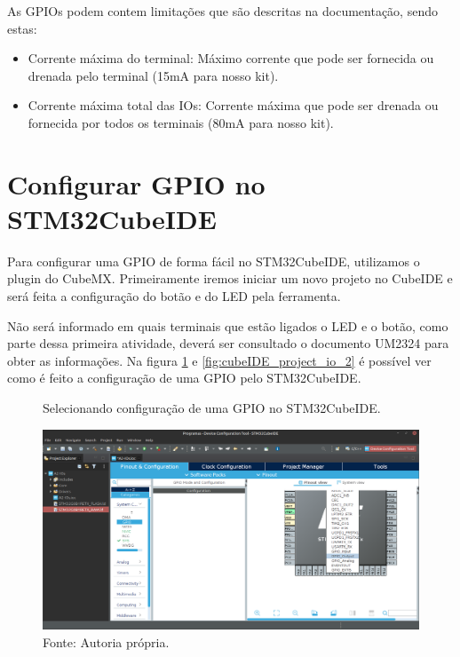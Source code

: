 \documentclass[12pt,a4paper]{report}
\begin{document}
As GPIOs podem contem limitações que são descritas na documentação, sendo estas:

\begin{itemize}
    \item Corrente máxima do terminal: Máximo corrente que pode ser fornecida ou drenada pelo terminal (15mA para nosso kit).
    \item Corrente máxima total das IOs: Corrente máxima que pode ser drenada ou fornecida por todos os terminais (80mA para nosso kit).
\end{itemize}

\section{Configurar GPIO no STM32CubeIDE}

Para configurar uma GPIO de forma fácil no STM32CubeIDE, utilizamos o plugin do CubeMX. Primeiramente iremos iniciar um novo projeto no CubeIDE e será feita a configuração do botão e do LED pela ferramenta.

Não será informado em quais terminais que estão ligados o LED e o botão, como parte dessa primeira atividade, deverá ser consultado o documento UM2324 para obter as informações. Na figura \ref{fig:cubeIDE_project_io_1} e \ref{fig:cubeIDE_project_io_2} é possível ver como é feito a configuração de uma GPIO pelo STM32CubeIDE.

\begin{figure}[H]
    \centering
    \caption{Selecionando configuração de uma GPIO no STM32CubeIDE.}
    \includegraphics[scale=0.2]{fig/cubeIDE_project_io_1.png}
    \caption*{Fonte: Autoria própria.}
    \label{fig:cubeIDE_project_io_1}
\end{figure}
\end{document}
